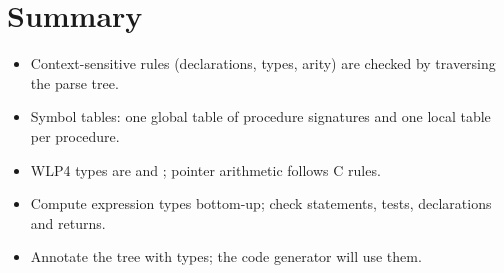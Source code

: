 \section{Summary}
\begin{itemize}
  \item Context-sensitive rules (declarations, types, arity) are checked by traversing the parse tree.
  \item Symbol tables: one global table of procedure signatures and one local table per procedure.
  \item WLP4 types are  and ; pointer arithmetic follows C rules.
  \item Compute expression types bottom-up; check statements, tests, declarations and returns.
  \item Annotate the tree with types; the code generator will use them.
\end{itemize}

